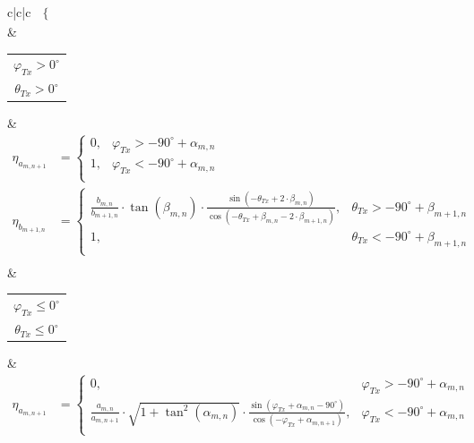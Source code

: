\begin{table}[tb]
\begin{tabular}{c|c|c}
\begin{math}
\begin{aligned}
\begin{cases}
				\end{cases}
			\end{aligned}		
		\end{math}\\
		\hline
		& 
		\begin{tabular}{@{}c@{}}$\varphi_{Tx}>0^\circ $ \\ $\theta_{Tx}>0^\circ $ \end{tabular}
		&
	\begin{math}
		\begin{aligned}
			\eta_{a_{m,n+1}} &=
			\begin{cases}
				0, & \varphi_{Tx} >-90^\circ + \alpha_{m,n}\\
				1, & \varphi_{Tx} < -90^\circ + \alpha_{m,n}\\
			\end{cases}\\
			\eta_{b_{m+1,n}} &=
			\begin{cases}
				\frac{b_{m,n}}{b_{m+1,n}} \cdot \tan(\beta_{m,n}) \cdot \frac{\sin(-\theta_{Tx}+ 2\cdot \beta_{m,n})}{\cos(-\theta_{Tx}+ \beta_{m,n}-2 \cdot \beta_{m+1,n})}, &  \theta_{Tx} > -90^\circ + \beta_{m+1,n} \\
				1, & \theta_{Tx} < -90^\circ + \beta_{m+1,n} \\
			\end{cases}\\
		\end{aligned}		
	\end{math}\\
		& 
		\begin{tabular}{@{}c@{}}$\varphi_{Tx} \leq 0^\circ $ \\ $\theta_{Tx} \leq 0^\circ $ \end{tabular}
		&
		\begin{math}
			\begin{aligned}
				\eta_{a_{m,n+1}} &=
				\begin{cases}
					0, & \varphi_{Tx} > -90^\circ + \alpha_{m,n}\\
					\frac{a_{m,n}}{a_{m,n+1}} \cdot \sqrt{1+ \tan^2 (\alpha_{m,n})} \cdot \frac{\sin(\varphi_{Tx}+ \alpha_{m,n}- 90^\circ)}{\cos(-\varphi_{Tx}+ \alpha_{m,n+1})}, & \varphi_{Tx} < -90^\circ + \alpha_{m,n}\\

\end{cases}
\end{aligned}
\end{math}
\end{tabular}
\end{table}
